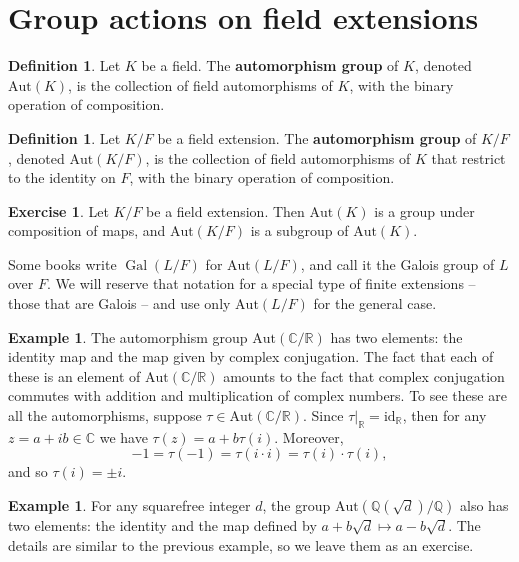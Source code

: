 \documentclass[12pt]{report}
\numberwithin{equation}{section}
\numberwithin{theorem}{chapter}
\theoremstyle{definition}
\newtheorem{definition}[theorem]{Definition}
\newtheorem{example}[theorem]{Example}
\newtheorem{exercise}{Exercise}
\newtheorem*{basic properties}{Basic Properties}
\newtheorem*{Important Remark}{Important Remark}
\DeclareMathOperator{\Gal}{Gal}
\newcommand{\C}{\mathbb{C}}
\begin{document}
\section{Group actions on field extensions}

\begin{definition}
Let $K$ be a field. The {\bf automorphism group} of $K$, denoted $\mathrm{Aut}(K)$, is the collection of field automorphisms of $K$, with the binary operation of composition.
\end{definition}

\begin{definition}
 Let $K/F$ be a field extension. The {\bf automorphism group} of $K/F$, denoted $\mathrm{Aut}(K/F)$, is the collection of field automorphisms of $K$ that restrict to the identity on $F$, with the binary operation of composition.
 \end{definition}
 
 
\begin{exercise} 
	Let $K/F$ be a field extension. Then $\mathrm{Aut}(K)$ is a group under composition of maps, and $\mathrm{Aut}(K/F)$ is a subgroup of $\mathrm{Aut}(K)$.
\end{exercise}


Some books write $\Gal(L/F)$ for $\mathrm{Aut}(L/F)$, and call it the Galois group of $L$ over $F$. We will reserve that notation for a special type of finite extensions -- those that are Galois -- and use only $\mathrm{Aut}(L/F)$ for the general case.


\begin{example}\label{example aut C over R}
The automorphism group $\mathrm{Aut}(\C/\mathbb{R})$ has two elements: the identity map and the map given by complex conjugation. The fact that each of these is an element of $\mathrm{Aut}(\C/\mathbb{R})$ amounts to the fact that complex conjugation commutes with addition and multiplication of complex numbers.
To see these are all the automorphisms, suppose $\tau \in \mathrm{Aut}(\C/\mathbb{R})$. Since $\tau|_\mathbb{R} = \mathrm{id}_\mathbb{R}$, then for any $z = a + ib \in \C$ we have $\tau(z) = a + b \tau(i)$. Moreover, 
$$-1 =\tau(-1) = \tau(i \cdot i) = \tau(i) \cdot \tau(i),$$ 
and so $\tau(i) =\pm i$.
\end{example}



\begin{example}
For any squarefree integer $d$, the group $\mathrm{Aut}(\mathbb{Q}(\sqrt{d})/\mathbb{Q})$ also has two elements: the identity and the map defined by $a + b \sqrt{d} \mapsto a - b \sqrt{d}$. The details are similar to the previous example, so we leave them as an exercise.
\end{example}
\end{document}
